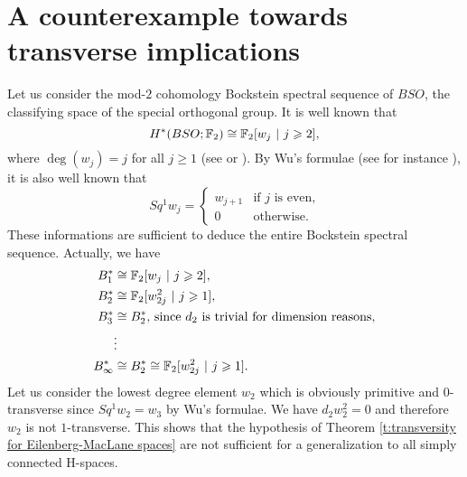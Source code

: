 \section{A counterexample towards transverse implications}\label{section:counterexample}

Let us consider the mod-$2$ cohomology Bockstein spectral sequence of $BSO$, the classifying space of the special orthogonal group. It is well known that 
$$
H^*(BSO;\F_2)\cong\F_2[w_j\ |\ j\geq2],
$$ where $\deg(w_j)=j$ for all $j\geq1$ (see \cite{Bo67} or \cite[p. 216]{Mc00}). By Wu's formulae (see for instance \cite[8, Part I, p. 138]{MT91}), it is also well known that 
$$
Sq^1w_j=
\begin{cases}
w_{j+1} &\text{if $j$ is even,}\\
0 &\text{otherwise.}
\end{cases}
$$ These informations are sufficient to deduce the entire Bockstein spectral sequence. Actually, we have
\begin{align*}
B_1^*&\cong \mathbb{F}_2[w_j\ |\ j\geqslant2],\\
B_2^*&\cong \mathbb{F}_2[w_{2j}^2\ |\ j\geqslant1],\\
B_3^*&\cong B_2^*\text{, since $d_2$ is trivial for dimension reasons,}\\
&\vdots\\
B_\infty^*&\cong B_2^*\cong \mathbb{F}_2[w_{2j}^2\ |\ j\geqslant1].
\end{align*}
Let us consider the lowest degree element $w_2$ which is obviously primitive and $0$-transverse since $Sq^1w_2=w_3$ by Wu's formulae. We have $d_2w_2^2=0$ and therefore $w_2$ is not $1$-transverse. This shows that the hypothesis of Theorem \ref{t:transversity for Eilenberg-MacLane spaces} are not sufficient for a generalization to all simply connected H-spaces.


\endinput